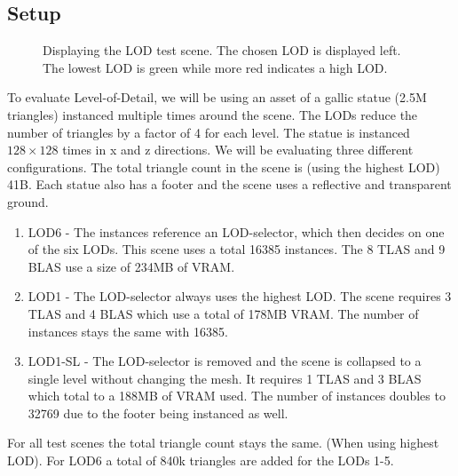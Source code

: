 \subsection{Setup}
\begin{figure}
\hfill
{}
\hfill
{}
\hfill
\caption{Displaying the LOD test scene. The chosen LOD is displayed left. The lowest LOD is green while more red indicates a high LOD.}
\label{fig:testLOD}
\end{figure}
To evaluate Level-of-Detail, we will be using an asset of a gallic statue (2.5M triangles) instanced multiple times around the scene. The LODs reduce the number of triangles by a factor of 4 for each level. The statue is instanced $128\times128$ times in x and z directions. We will be evaluating three different configurations. The total triangle count in the scene is (using the highest LOD) 41B. Each statue also has a footer and the scene uses a reflective and transparent ground.
\begin{enumerate}
    \item LOD6 - The instances reference an LOD-selector, which then decides on one of the six LODs. This scene uses a total 16385 instances. The 8 TLAS and 9 BLAS use a size of 234MB of VRAM.
    \item LOD1 - The LOD-selector always uses the highest LOD. The scene requires 3 TLAS and 4 BLAS which use a total of 178MB VRAM. The number of instances stays the same with 16385.
    \item LOD1-SL - The LOD-selector is removed and the scene is collapsed to a single level without changing the mesh. It requires 1 TLAS and 3 BLAS which total to a 188MB of VRAM used. The number of instances doubles to 32769 due to the footer being instanced as well.
\end{enumerate}
For all test scenes the total triangle count stays the same. (When using highest LOD). For LOD6 a total of 840k triangles are added for the LODs 1-5.
\newpage
